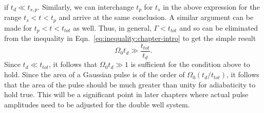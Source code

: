 if $t_d \ll t_{s,p}$. Similarly, we can interchange $t_p$ for $t_s$ in the above expression for the range $t_s<t<t_p$ and arrive at the same conclusion. A similar argument can be made for $t_p<t<t_{tot}$ as well. Thus, in general, $\Gamma<t_{tot}$ and so can be eliminated from the inequality in Eqn.~\ref{eq:inequality:chapter-intro} to get the simple result
\begin{equation}
\Omega_0 t_d \gg \frac{t_{tot}}{t_d}.
\end{equation}
Since $t_d \ll t_{tot}$, it follows that $\Omega_0 t_d \gg 1$ is sufficient for the condition above to hold. Since the area of a Gaussian pulse is of the order of $\Omega_0  (t_d/t_{tot})$, it follows that the area of the pulse should be much greater than unity for adiabaticity to hold true. This will be a significant point in later chapters where actual pulse amplitudes need to be adjusted for the double well system.
